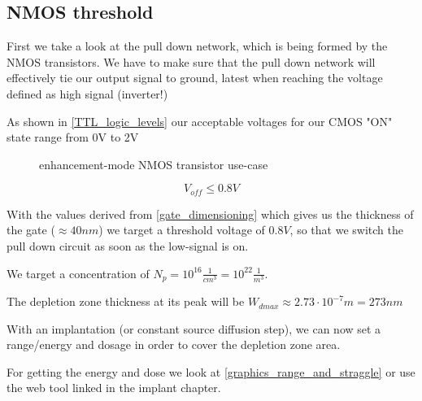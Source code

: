 \subsection{NMOS threshold}\label{nmos_dimensioning}
First we take a look at the pull down network, which is being formed by the NMOS transistors.
We have to make sure that the pull down network will effectively tie our output signal to ground, latest when reaching the voltage defined as high signal (inverter!)

As shown in  \autoref{TTL_logic_levels} our acceptable voltages for our CMOS "ON" state range from 0V to 2V

\begin{figure}[H]
	\centering
	\begin{circuitdiagram}{20}{20}
	\end{circuitdiagram}
	\caption{enhancement-mode NMOS transistor use-case}
\end{figure}

\begin{equation}
V_{off} \leq 0.8 V
\end{equation}

With the values derived from \autoref{gate_dimensioning} which gives us the thickness of the gate ($\approx 40nm$) we target a threshold voltage of $0.8V$,  so that we switch the pull down circuit as soon as the low-signal is on.

We target a concentration of $N_p = 10^{16}\frac{1}{cm^3}=10^{22}\frac{1}{m^3}$.

The depletion zone thickness at its peak will be $W_{dmax} \approx 2.73 \cdot 10^{-7} m = 273 nm$

With an implantation (or constant source diffusion step), we can now set a range/energy and dosage in order to cover the depletion zone area.

For getting the energy and dose we look at \autoref{graphics_range_and_straggle} or use the web tool linked in the implant chapter.

